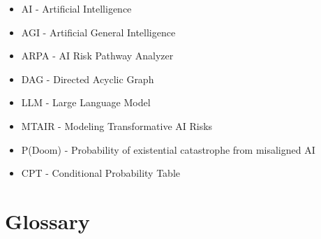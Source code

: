 \documentclass[
  11pt,
  letterpaper,
]{book}
\providecommand{\tightlist}{%
  \setlength{\itemsep}{0pt}\setlength{\parskip}{0pt}}
\begin{document}
\begin{itemize}
\tightlist
\item
  AI - Artificial Intelligence\\
\item
  AGI - Artificial General Intelligence\\
\item
  ARPA - AI Risk Pathway Analyzer\\
\item
  DAG - Directed Acyclic Graph\\
\item
  LLM - Large Language Model\\
\item
  MTAIR - Modeling Transformative AI Risks\\
\item
  P(Doom) - Probability of existential catastrophe from misaligned AI\\
\item
  CPT - Conditional Probability Table
\end{itemize}

\section*{Glossary}\label{glossary}

\end{document}

